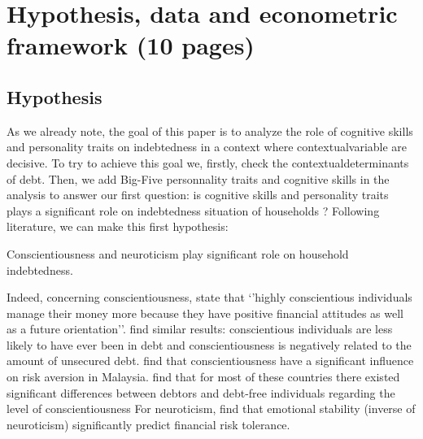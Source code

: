 \documentclass[a4paper, 11pt, onecolumn]{article}
\begin{document}
\newpage
\section{Hypothesis, data and econometric framework (10 pages)}

	\subsection{Hypothesis}

As we already note, the goal of this paper is to analyze the role of cognitive skills and personality traits on indebtedness in a context where contextualvariable are decisive.
To try to achieve this goal we, firstly, check the contextualdeterminants of debt.
Then, we add Big-Five personnality traits and cognitive skills in the analysis to answer our first question: is cognitive skills and personality traits plays a significant role on indebtedness situation of households ?
Following literature, we can make this first hypothesis:
\begin{hyp} \label{hyp:stability}
Conscientiousness and neuroticism play significant role on household indebtedness.
\end{hyp}
Indeed, concerning conscientiousness, \cite{Donnelly2012} state that `'highly conscientious individuals manage their money more because they have positive financial attitudes as well as a future orientation''.
\cite{Brown2014, Nyhus2001} find similar results: conscientious individuals are less likely to have ever been in debt and conscientiousness is negatively related to the amount of unsecured debt.
\cite{Nga2013} find that conscientiousness have a significant influence on risk aversion in Malaysia.
\cite{Forlicz2019} find that for most of these countries there existed significant differences between debtors and debt-free individuals regarding the level of conscientiousness
For neuroticism, \cite{Pinjisakikool2017b} find that emotional stability (inverse of neuroticism) significantly predict financial risk tolerance.
\end{document}
